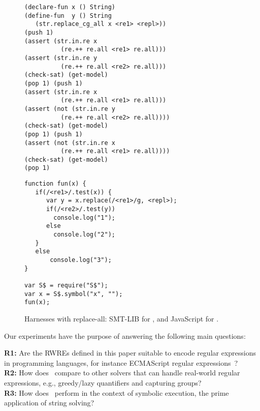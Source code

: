 \begin{figure}[tb]
  \scriptsize

  \begin{minipage}{0.49\linewidth}
\begin{verbatim}
(declare-fun x () String)
(define-fun  y () String
   (str.replace_cg_all x <re1> <repl>))
(push 1)
(assert (str.in.re x 
          (re.++ re.all <re1> re.all)))
(assert (str.in.re y 
          (re.++ re.all <re2> re.all)))
(check-sat) (get-model)
(pop 1) (push 1)
(assert (str.in.re x 
          (re.++ re.all <re1> re.all)))
(assert (not (str.in.re y 
          (re.++ re.all <re2> re.all))))
(check-sat) (get-model)
(pop 1) (push 1)
(assert (not (str.in.re x 
          (re.++ re.all <re1> re.all))))
(check-sat) (get-model)
(pop 1)
\end{verbatim}
  \end{minipage}\hfill
  \raisebox{-25ex}{\rule{0.4pt}{52ex}}\hfill
  \begin{minipage}{0.49\linewidth}
\begin{verbatim}
function fun(x) {
   if(/<re1>/.test(x)) {
      var y = x.replace(/<re1>/g, <repl>);
      if(/<re2>/.test(y))
        console.log("1");
      else
        console.log("2");
   }
   else
       console.log("3");
}

var S$ = require("S$");
var x = S$.symbol("x", "");
fun(x);
\end{verbatim}
  \end{minipage}
  
  \caption{Harnesses with replace-all: SMT-LIB for \ostrich,
    and JavaScript for \expose{}.}
  \label{fig:harness}
  \vspace{-4mm}
\end{figure}

Our experiments have the purpose of answering the following main questions:

\medskip
\noindent
\textbf{R1:} Are the  RWREs defined in this paper
suitable to encode regular expressions in programming languages,
for instance ECMAScript regular expressions~\cite{ECMAScript11}?
\\
\textbf{R2:} How does \ostrich\ compare to other solvers that can
handle real-world regular expressions, e.g., greedy/lazy
quantifiers and capturing groups?
\\
\textbf{R3:} How does \ostrich\ perform in the context of symbolic execution,
the prime application of string solving?

\vspace{-2mm}

